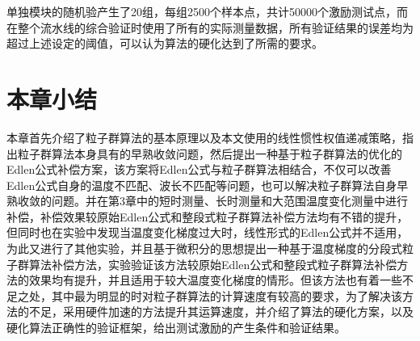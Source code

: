单独模块的随机验产生了20组，每组2500个样本点，共计50000个激励测试点，而在整个流水线的综合验证时使用了所有的实际测量数据，所有验证结果的误差均为超过上述设定的阈值，可以认为算法的硬化达到了所需的要求。

\section{本章小结}
本章首先介绍了粒子群算法的基本原理以及本文使用的线性惯性权值递减策略，指出粒子群算法本身具有的早熟收敛问题，然后提出一种基于粒子群算法的优化的Edlen公式补偿方案，该方案将Edlen公式与粒子群算法相结合，不仅可以改善Edlen公式自身的温度不匹配、波长不匹配等问题，也可以解决粒子群算法自身早熟收敛的问题。并在第3章中的短时测量、长时测量和大范围温度变化测量中进行补偿，补偿效果较原始Edlen公式和整段式粒子群算法补偿方法均有不错的提升，但同时也在实验中发现当温度变化梯度过大时，线性形式的Edlen公式并不适用，为此又进行了其他实验，并且基于微积分的思想提出一种基于温度梯度的分段式粒子群算法补偿方法，实验验证该方法较原始Edlen公式和整段式粒子群算法补偿方法的效果均有提升，并且适用于较大温度变化梯度的情形。但该方法也有着一些不足之处，其中最为明显的时对粒子群算法的计算速度有较高的要求，为了解决该方法的不足，采用硬件加速的方法提升其运算速度，并介绍了算法的硬化方案，以及硬化算法正确性的验证框架，给出测试激励的产生条件和验证结果。
